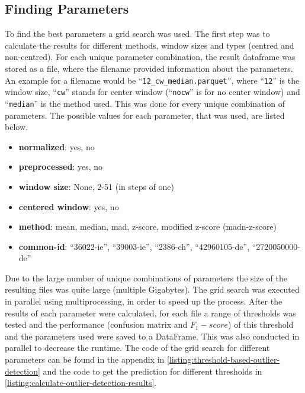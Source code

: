 \subsection{Finding Parameters}
To find the best parameters a grid search was used. The first step was to calculate the results for different methods, window sizes and types (centred and non-centred). For each unique parameter combination, the result dataframe was stored as a file, where the filename provided information about the parameters. An example for a filename would be ``\verb|12_cw_median.parquet|'', where ``\verb|12|'' is the window size, ``\verb|cw|'' stands for center window (``\verb|nocw|'' is for no center window) and ``\verb|median|'' is the method used. This was done for every unique combination of parameters. The possible values for each parameter, that was used, are listed below.
\begin{itemize}
    \item \textbf{normalized}: yes, no
    \item \textbf{preprocessed}: yes, no 
    \item \textbf{window size}: None, 2-51 (in steps of one)
    \item \textbf{centered window}: yes, no
    \item \textbf{method}: mean, median, mad, z-score, modified z-score (madn-z-score)
    \item \textbf{common-id}: ``36022-ie'', ``39003-ie'', ``2386-ch'', ``42960105-de'', ``2720050000-de''
\end{itemize}
Due to the large number of unique combinations of parameters the size of the resulting files was quite large (multiple Gigabytes). The grid search was executed in parallel using multiprocessing, in order to speed up the process.
\newline
After the results of each parameter were calculated, for each file a range of thresholds was tested and the performance (confusion matrix and $F_1-score$) of this threshold and the parameters used were saved to a DataFrame. This was also conducted in parallel to decrease the runtime.
\newline
The code of the grid search for different parameters can be found in the appendix in \autoref{listing:threshold-based-outlier-detection} and the code to get the prediction for different thresholds in \autoref{listing:calculate-outlier-detection-results}.

